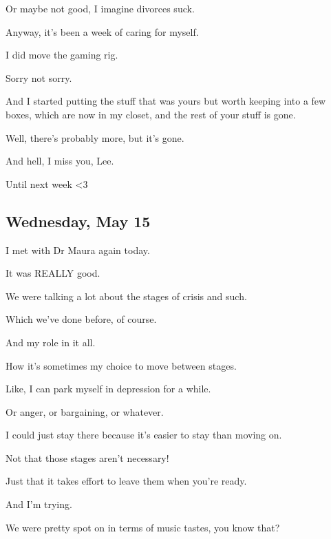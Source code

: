 { Or maybe not good, I imagine divorces suck.

 Anyway, it's been a week of caring for myself.

 I did move the gaming rig.

 Sorry not sorry.

 And I started putting the stuff that was yours but worth keeping into a few boxes, which are now in my closet, and the rest of your stuff is gone.

 Well, there's probably more, but it's gone.

 And hell, I miss you, Lee.

 Until next week \textless{}3

\newpage

\subsection*{Wednesday, May 15}\label{wednesday-may-15}

 I met with Dr Maura again today.

 It was REALLY good.

 We were talking a lot about the stages of crisis and such.

 Which we've done before, of course.

 And my role in it all.

 How it's sometimes my choice to move between stages.

 Like, I can park myself in depression for a while.

 Or anger, or bargaining, or whatever.

 I could just stay there because it's easier to stay than moving on.

 Not that those stages aren't necessary!

 Just that it takes effort to leave them when you're ready.

 And I'm trying.

 We were pretty spot on in terms of music tastes, you know that?

}
